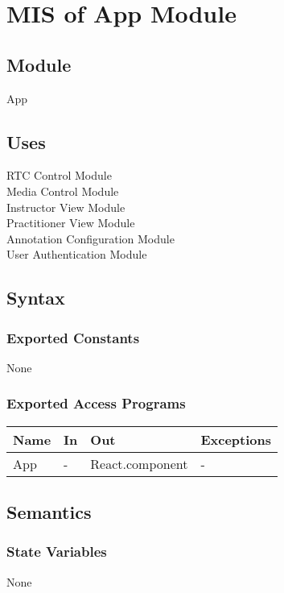 \documentclass[12pt, titlepage]{article}
\begin{document}
\section{MIS of App Module}
\label{sec:appmodule}

\subsection{Module}
App

\subsection{Uses}
RTC Control Module\\
Media Control Module\\
Instructor View Module\\
Practitioner View Module\\
Annotation Configuration Module\\
User Authentication Module

\subsection{Syntax}

\subsubsection{Exported Constants}
None

\subsubsection{Exported Access Programs}
\begin{table}[h!]
  \centering
  \begin{tabular}{llll}
    \toprule
    \textbf{Name} & \textbf{In} & \textbf{Out}            & \textbf{Exceptions} \\
    \midrule
    App           & -           & React.component         & -                   \\
    \bottomrule
  \end{tabular}
\end{table}

\subsection{Semantics}

\subsubsection{State Variables}
None
\end{document}
